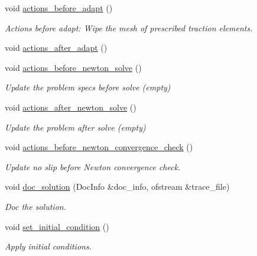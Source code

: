 \begin{DoxyCompactItemize}
void \hyperlink{classFSICollapsibleChannelProblem_a91b30b3d0369c178d3a79f5658644f1b}{actions\+\_\+before\+\_\+adapt} ()
\begin{DoxyCompactList}\small\item\em Actions before adapt\+: Wipe the mesh of prescribed traction elements. \end{DoxyCompactList}\item 
void \hyperlink{classFSICollapsibleChannelProblem_ae20eb7ed895e0063ade5a6d0c6f9af2f}{actions\+\_\+after\+\_\+adapt} ()
\item 
void \hyperlink{classFSICollapsibleChannelProblem_ad10b2d12be052c6b1bc5005dc27cd229}{actions\+\_\+before\+\_\+newton\+\_\+solve} ()
\begin{DoxyCompactList}\small\item\em Update the problem specs before solve (empty) \end{DoxyCompactList}\item 
void \hyperlink{classFSICollapsibleChannelProblem_a49780267c05f4c6ecbed11bfc6b9956b}{actions\+\_\+after\+\_\+newton\+\_\+solve} ()
\begin{DoxyCompactList}\small\item\em Update the problem after solve (empty) \end{DoxyCompactList}\item 
void \hyperlink{classFSICollapsibleChannelProblem_ace5343d2e6e6e0480d077d4f17365288}{actions\+\_\+before\+\_\+newton\+\_\+convergence\+\_\+check} ()
\begin{DoxyCompactList}\small\item\em Update no slip before Newton convergence check. \end{DoxyCompactList}\item 
void \hyperlink{classFSICollapsibleChannelProblem_aff5cacbc8d81f6c1beda947085496462}{doc\+\_\+solution} (Doc\+Info \&doc\+\_\+info, ofstream \&trace\+\_\+file)
\begin{DoxyCompactList}\small\item\em Doc the solution. \end{DoxyCompactList}\item 
void \hyperlink{classFSICollapsibleChannelProblem_afdd6752cb134fd09ee8830158ed557b2}{set\+\_\+initial\+\_\+condition} ()
\begin{DoxyCompactList}\small\item\em Apply initial conditions. \end{DoxyCompactList}\end{DoxyCompactItemize}
